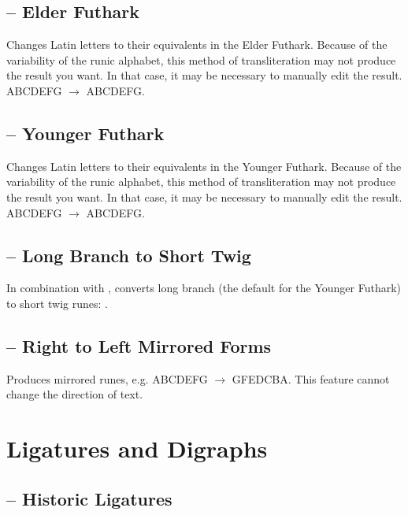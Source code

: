 \subsection{ -- Elder
Futhark}
Changes Latin letters to their equivalents in the Elder Futhark. Because of the variability of the runic alphabet, this
method of transliteration may not produce the result you want. In that case, it may be necessary to manually edit the
result. ABCDEFG $\rightarrow $ {ABCDEFG}.

\subsection{ -- Younger
Futhark}
Changes Latin letters to their equivalents in the Younger Futhark. Because of the variability of the runic alphabet,
this method of transliteration may not produce the result you want. In that case, it may be necessary to manually edit
the result. ABCDEFG $\rightarrow $ {ABCDEFG}.

\subsection{ --
Long Branch to Short Twig}
In combination with , converts long branch (the default for the Younger Futhark) to short twig runes:
{}.

\subsection{
-- Right to Left Mirrored Forms}
Produces mirrored runes, e.g. {ABCDEFG $\rightarrow $ GFEDCBA}.
This feature cannot change the direction of text.

\section{Ligatures and Digraphs}

\subsection{ -- Historic Ligatures}

